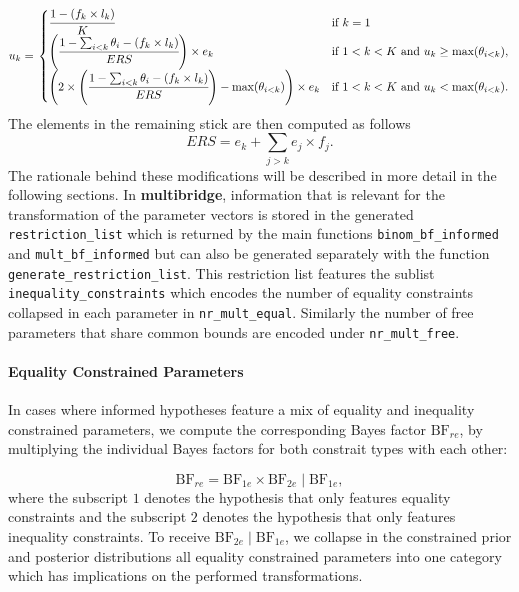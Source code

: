 \begin{appendix}
\begin{align}
  u_k = \left.
  \begin{cases}
      \cfrac{1 - (f_k \times l_k)}{K} & \text{if } k = 1 \\
     \left( \cfrac{1 - \sum_{i < k} \theta_i - (f_k \times l_k)}{ERS} \right) \times e_k & \text{if } 1 < k < K \text{ and } u_k \geq \text{max}(\theta_{i < k}), \\
    \left( 2 \times \left( \cfrac{1 - \sum_{i < k} \theta_i - (f_k \times l_k)}{ERS} \right) - \text{max}(\theta_{i < k}) \right)  \times e_k & \text{if } 1 < k < K \text{ and } u_k < \text{max}(\theta_{i < k}).
  \end{cases}
    \right.
\end{align} The elements in the remaining stick are then computed as
follows \[ERS = e_k + \sum_{j > k} e_j \times f_j.\] The rationale
behind these modifications will be described in more detail in the
following sections. In \textbf{multibridge}, information that is
relevant for the transformation of the parameter vectors is stored in
the generated \texttt{restriction\_list} which is returned by the main
functions \texttt{binom\_bf\_informed} and \texttt{mult\_bf\_informed}
but can also be generated separately with the function
\texttt{generate\_restriction\_list}. This restriction list features the
sublist \texttt{inequality\_constraints} which encodes the number of
equality constraints collapsed in each parameter in
\texttt{nr\_mult\_equal}. Similarly the number of free parameters that
share common bounds are encoded under \texttt{nr\_mult\_free}.

\hypertarget{equality-constrained-parameters}{%
\paragraph{Equality Constrained
Parameters}\label{equality-constrained-parameters}}

In cases where informed hypotheses feature a mix of equality and
inequality constrained parameters, we compute the corresponding Bayes
factor \(\text{BF}_{re}\), by multiplying the individual Bayes factors
for both constrait types with each other:

\[
\text{BF}_{re}
= \text{BF}_{1e} \times \text{BF}_{2e} \mid \text{BF}_{1e},
\] where the subscript \(1\) denotes the hypothesis that only features
equality constraints and the subscript \(2\) denotes the hypothesis that
only features inequality constraints. To receive
\(\text{BF}_{2e} \mid \text{BF}_{1e}\), we collapse in the constrained
prior and posterior distributions all equality constrained parameters
into one category which has implications on the performed
transformations.


\end{appendix}
